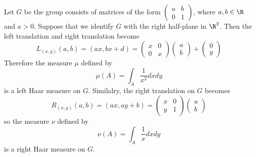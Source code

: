 \begin{example}\label{Haar measure ab01}
Let $G$ be the group consists of matrices of the form $(\begin{smallmatrix}
a&b\\0&1\end{smallmatrix})$, where $a,b\in\R$ and $a>0$. Suppose that we identify $G$ with the right half-plane in $\R^2$. Then the left translation and right translation become
\[
L_{(x,y)}(a,b)=(ax,bx+d)=\begin{pmatrix}
x&0\\
0&x
\end{pmatrix}\begin{pmatrix}
a\\
b
\end{pmatrix}+\begin{pmatrix}
0\\
y
\end{pmatrix}\]
Therefore the measure $\mu$ defined by
\[\mu(A)=\int_A\frac{1}{x^2}dxdy\]
is a left Haar measure on $G$. Similalry, the right translation on $G$ becomes
\[R_{(x,y)}(a,b)=(ax,ay+b)=\begin{pmatrix}
x&0\\
y&1
\end{pmatrix}\begin{pmatrix}
a\\
b
\end{pmatrix}
\]
so the measure $\nu$ defined by
\[\nu(A)=\int_A\frac{1}{x}dxdy\]
is a right Haar measure on $G$.
\end{example}
